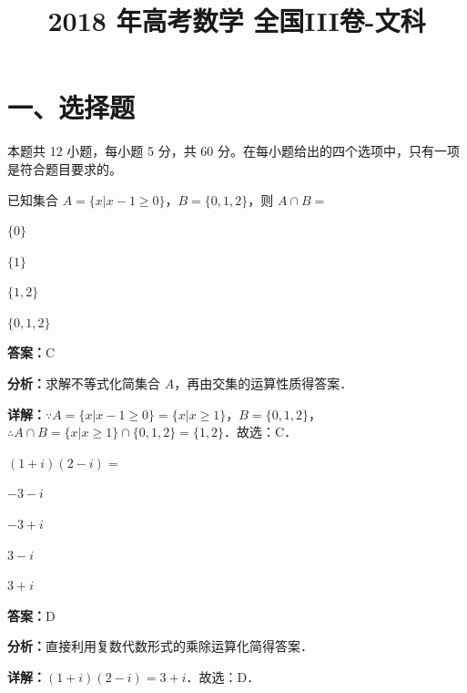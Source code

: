﻿\title{2018 年高考数学 全国III卷-文科}
\date{}
\maketitle

\section*{一、选择题}
本题共 12 小题，每小题 5 分，共 60 分。在每小题给出的四个选项中，只有一项是符合题目要求的。

\begin{question}[points=5]
已知集合 $A=\{x|x-1\ge 0\}$，$B=\{0,1,2\}$，则 $A\cap B=$
\begin{choices}
  \item $\{0\}$
  \item $\{1\}$
  \item $\{1,2\}$
  \item $\{0,1,2\}$
\end{choices}
\begin{solution}
\textbf{答案：}C

\textbf{分析：}求解不等式化简集合 $A$，再由交集的运算性质得答案．

\textbf{详解：}$\because A=\{x|x-1\ge 0\}=\{x|x\ge 1\}$，$B=\{0,1,2\}$，$\therefore A\cap B=\{x|x\ge 1\}\cap\{0,1,2\}=\{1,2\}$．故选：C．
\end{solution}
\end{question}

\begin{question}[points=5]
$(1+i)(2-i)=$
\begin{choices}
  \item $-3-i$
  \item $-3+i$
  \item $3-i$
  \item $3+i$
\end{choices}
\begin{solution}
\textbf{答案：}D

\textbf{分析：}直接利用复数代数形式的乘除运算化简得答案．

\textbf{详解：}$(1+i)(2-i)=3+i$．故选：D．
\end{solution}
\end{question}

